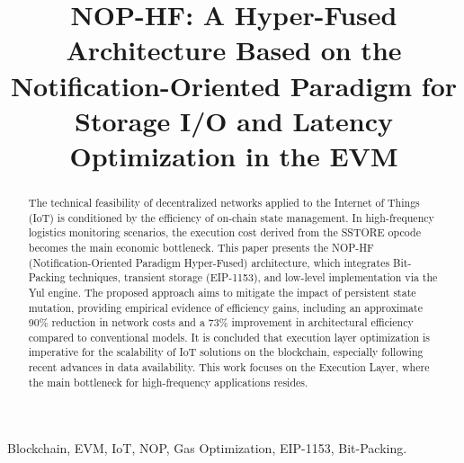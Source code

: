 \documentclass[conference]{IEEEtran}
\begin{document}
\title{NOP-HF: A Hyper-Fused Architecture Based on the Notification-Oriented Paradigm for Storage I/O and Latency Optimization in the EVM}

\author{
}

\maketitle

\begin{abstract}
The technical feasibility of decentralized networks applied to the Internet of Things (IoT) is conditioned by the efficiency of on-chain state management. In high-frequency logistics monitoring scenarios, the execution cost derived from the SSTORE opcode becomes the main economic bottleneck. This paper presents the NOP-HF (Notification-Oriented Paradigm Hyper-Fused) architecture, which integrates Bit-Packing techniques, transient storage (EIP-1153), and low-level implementation via the Yul engine. The proposed approach aims to mitigate the impact of persistent state mutation, providing empirical evidence of efficiency gains, including an approximate 90\% reduction in network costs and a 73\% improvement in architectural efficiency compared to conventional models. It is concluded that execution layer optimization is imperative for the scalability of IoT solutions on the blockchain, especially following recent advances in data availability. This work focuses on the Execution Layer, where the main bottleneck for high-frequency applications resides.
\end{abstract}

\begin{IEEEkeywords}
Blockchain, EVM, IoT, NOP, Gas Optimization, EIP-1153, Bit-Packing.
\end{IEEEkeywords}
\end{document}
